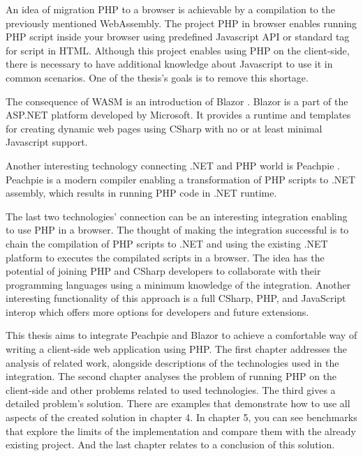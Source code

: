 An idea of migration PHP to a browser is achievable by a compilation to the previously mentioned WebAssembly.
The project PHP in browser  enables running PHP script inside your browser using predefined Javascript API or standard tag for script in HTML.
Although this project enables using PHP on the client-side, there is necessary to have additional knowledge about Javascript to use it in common scenarios.
One of the thesis's goals is to remove this shortage.

The consequence of WASM is an introduction of Blazor .
Blazor is a part of the ASP.NET platform developed by Microsoft.
It provides a runtime and templates for creating dynamic web pages using CSharp with no or at least minimal Javascript support.

Another interesting technology connecting .NET and PHP world is Peachpie .
Peachpie is a modern compiler enabling a transformation of PHP scripts to .NET assembly, which results in running PHP code in .NET runtime.

The last two technologies' connection can be an interesting integration enabling to use PHP in a browser.
The thought of making the integration successful is to chain the compilation of PHP scripts to .NET and using the existing .NET platform to executes the compilated scripts in a browser.
The idea has the potential of joining PHP and CSharp developers to collaborate with their programming languages using a minimum knowledge of the integration.
Another interesting functionality of this approach is a full CSharp, PHP, and JavaScript interop which offers more options for developers and future extensions.

This thesis aims to integrate Peachpie and Blazor to achieve a comfortable way of writing a client-side web application using PHP.
The first chapter addresses the analysis of related work, alongside descriptions of the technologies used in the integration.
The second chapter analyses the problem of running PHP on the client-side and other problems related to used technologies.
The third gives a detailed problem's solution.
There are examples that demonstrate how to use all aspects of the created solution in chapter 4.
In chapter 5, you can see benchmarks that explore the limits of the implementation and compare them with the already existing project.
And the last chapter relates to a conclusion of this solution.
